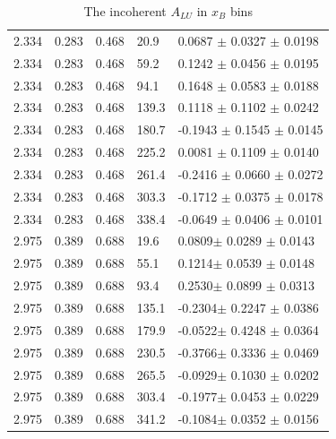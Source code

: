 \begin{table}[!h]
\begin{center}
\begin{tabular}{||l|l|l|l|l||}
  2.334 & 0.283 & 0.468 &  20.9  &  0.0687 $\pm$ 0.0327  $\pm$  0.0198 \\
  2.334 & 0.283 & 0.468 &  59.2  &  0.1242 $\pm$ 0.0456  $\pm$  0.0195 \\
  2.334 & 0.283 & 0.468 &  94.1  &  0.1648 $\pm$ 0.0583  $\pm$  0.0188 \\
  2.334 & 0.283 & 0.468 & 139.3  &  0.1118 $\pm$ 0.1102  $\pm$  0.0242 \\
  2.334 & 0.283 & 0.468 & 180.7  & -0.1943 $\pm$ 0.1545  $\pm$  0.0145 \\
  2.334 & 0.283 & 0.468 & 225.2  &  0.0081 $\pm$ 0.1109  $\pm$  0.0140 \\
  2.334 & 0.283 & 0.468 & 261.4  & -0.2416 $\pm$ 0.0660  $\pm$  0.0272 \\
  2.334 & 0.283 & 0.468 & 303.3  & -0.1712 $\pm$ 0.0375  $\pm$  0.0178 \\
  2.334 & 0.283 & 0.468 & 338.4  & -0.0649 $\pm$ 0.0406  $\pm$  0.0101 \\
  \hline                                                              
                                                                         
  2.975 & 0.389 & 0.688 &   19.6 &   0.0809$\pm$  0.0289 $\pm$  0.0143 \\
  2.975 & 0.389 & 0.688 &   55.1 &   0.1214$\pm$  0.0539 $\pm$  0.0148 \\
  2.975 & 0.389 & 0.688 &   93.4 &   0.2530$\pm$  0.0899 $\pm$  0.0313 \\
  2.975 & 0.389 & 0.688 &  135.1 &  -0.2304$\pm$  0.2247 $\pm$  0.0386 \\
  2.975 & 0.389 & 0.688 &  179.9 &  -0.0522$\pm$  0.4248 $\pm$  0.0364 \\
  2.975 & 0.389 & 0.688 &  230.5 &  -0.3766$\pm$  0.3336 $\pm$  0.0469 \\
  2.975 & 0.389 & 0.688 &  265.5 &  -0.0929$\pm$  0.1030 $\pm$  0.0202 \\
  2.975 & 0.389 & 0.688 &  303.4 &  -0.1977$\pm$  0.0453 $\pm$  0.0229 \\
  2.975 & 0.389 & 0.688 &  341.2 &  -0.1084$\pm$  0.0352 $\pm$  0.0156 \\
 \hline
 \hline
 \end{tabular}
 \caption{The incoherent $A_{LU}$ in $x_B$ bins}
 \label{table:InCoh_xB_BSA}
 \end{center}
\end{table}



